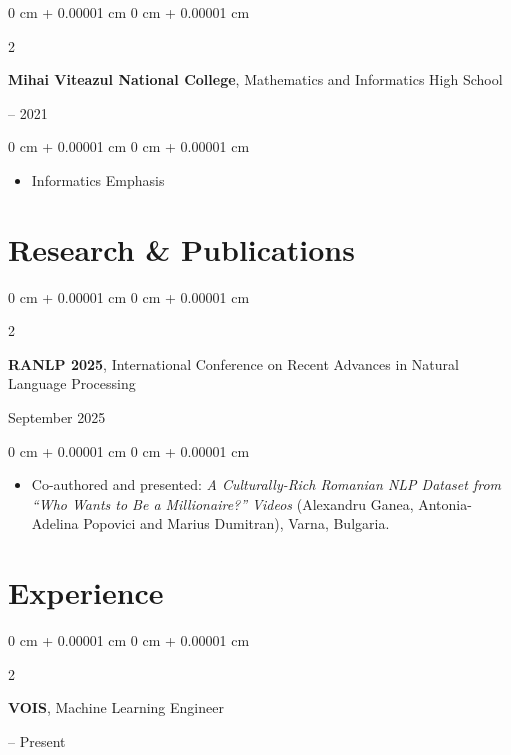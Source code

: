\documentclass[10pt, letterpaper]{article}
\newenvironment{highlights}{
    \begin{itemize}[
        topsep=0.10 cm,
        parsep=0.10 cm,
        partopsep=0pt,
        itemsep=0pt,
        leftmargin=0 cm + 10pt
    ]
}{
    \end{itemize}
}
\newenvironment{onecolentry}{
    \begin{adjustwidth}{
        0 cm + 0.00001 cm
    }{
        0 cm + 0.00001 cm
    }
}{
    \end{adjustwidth}
}
\newenvironment{twocolentry}[2][]{
    \onecolentry
    \def\secondColumn{#2}
    \setcolumnwidth{\fill, 4.5 cm}
    \begin{paracol}{2}
}{
    \switchcolumn \raggedleft \secondColumn
    \end{paracol}
    \endonecolentry
}
\begin{document}
\vspace{0.2 cm}

\begin{twocolentry}{
    2017 -- 2021
}
    \textbf{Mihai Viteazul National College}, Mathematics and Informatics High School
\end{twocolentry}

\vspace{0.10 cm}
\begin{onecolentry}
    \begin{highlights}
        \item Informatics Emphasis
    \end{highlights}
\end{onecolentry}



\section{Research \& Publications}

\begin{twocolentry}{
    September 2025
}
    \textbf{RANLP 2025}, International Conference on Recent Advances in Natural Language Processing
\end{twocolentry}

\vspace{0.10 cm}
\begin{onecolentry}
    \begin{highlights}
        \item Co-authored and presented: \textit{A Culturally-Rich Romanian NLP Dataset from ``Who Wants to Be a Millionaire?'' Videos} (Alexandru Ganea, Antonia-Adelina Popovici and Marius Dumitran), Varna, Bulgaria.
    \end{highlights}
\end{onecolentry}

\section{Experience}

\begin{twocolentry}{
    2024 -- Present
}
    \textbf{VOIS}, Machine Learning Engineer
\end{twocolentry}
\end{document}
